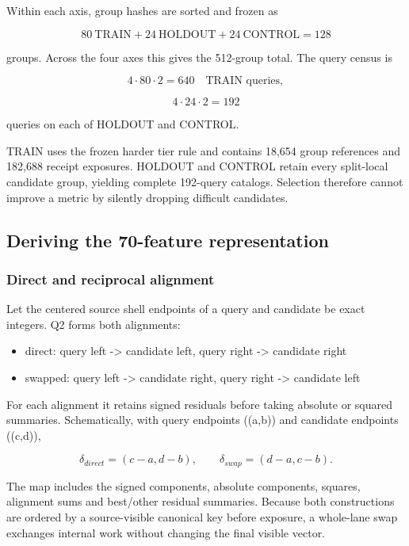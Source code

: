 Within each axis, group hashes are sorted and frozen as

\[
80\ \text{TRAIN}+24\ \text{HOLDOUT}+24\ \text{CONTROL}=128
\]

groups. Across the four axes this gives the 512-group total. The query
census is

\[
4\cdot80\cdot2=640\quad\text{TRAIN queries},
\]

\[
4\cdot24\cdot2=192
\]

queries on each of HOLDOUT and CONTROL.

TRAIN uses the frozen harder tier rule and contains 18,654 group
references and 182,688 receipt exposures. HOLDOUT and CONTROL retain
every split-local candidate group, yielding complete 192-query catalogs.
Selection therefore cannot improve a metric by silently dropping
difficult candidates.

\subsection{Deriving the 70-feature
representation}\label{viii-ch07-deriving-the-70-feature-representation}

\subsubsection{Direct and reciprocal
alignment}\label{viii-ch07-direct-and-reciprocal-alignment}

Let the centered source shell endpoints of a query and candidate be
exact integers. Q2 forms both alignments:

\begin{itemize}
\tightlist
\item
  direct: query left -\textgreater{} candidate left, query right
  -\textgreater{} candidate right
\item
  swapped: query left -\textgreater{} candidate right, query right
  -\textgreater{} candidate left
\end{itemize}

For each alignment it retains signed residuals before taking absolute or
squared summaries. Schematically, with query endpoints ((a,b)) and
candidate endpoints ((c,d)),

\[
\delta_{direct}=(c-a,d-b),
\qquad
\delta_{swap}=(d-a,c-b).
\]

The map includes the signed components, absolute components, squares,
alignment sums and best/other residual summaries. Because both
constructions are ordered by a source-visible canonical key before
exposure, a whole-lane swap exchanges internal work without changing the
final visible vector.

